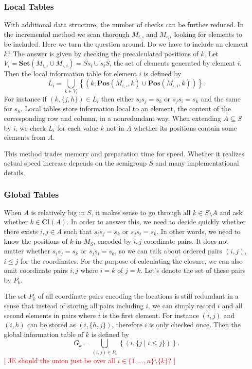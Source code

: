 \documentclass{amsart}
\newcommand{\Set}{\mathbf{Set}}
\newcommand{\Closure}{\mathbf{Cl}}
\newcommand{\Pos}{\mathbf{Pos}}
\newcommand{\todo}[1]{\textcolor{red}{ \small \textsf{[ #1 ]} \normalsize}}
\theoremstyle{plain}
\theoremstyle{definition}
\begin{document}
\subsubsection{Local Tables}
With additional data structure, the number of checks can be further reduced. 
In the incremental method we scan thorough $M_{i,\square}$ and $M_{\square,i}$ looking for elements to be included.
Here we turn the question around.
Do we have to include an element $k$?
The answer is given by checking the precalculated positions of $k$. 
Let $V_i=\Set(M_{i,\square}\cup M_{\square,i})=Ss_i\cup s_iS$, the set of elements generated by element $i$.
Then the  local information table for element $i$ is defined by
$$L_i=\bigcup_{k\in V_i}\left\{(k,\Pos(M_{i,\square},k)\cup\Pos(M_{\square,i},k))\right\}.$$
For instance if $(k,\{j,h\})\in L_i$ then either $s_is_j=s_k$ or $s_js_i=s_k$ and the same for $s_h$.
Local tables store information local to an element, the content of the corresponding row and column, in a nonredundant way.
When  extending $A\subseteq S$ by $i$, we check $L_i$ for each value $k$ not in $A$ whether its positions contain some elements from $A$. 

This method trades memory and preparation time for speed. Whether it realizes actual speed increase depends on the semigroup $S$ and many implementational details.

\subsubsection{Global Tables}
When $A$ is relatively big in $S$, it makes sense to go through all $k\in S\setminus A$ and ask whether $k\in\Closure(A)$. 
In order to answer this, we need to decide quickly whether there exists $i,j\in A$ such that $s_is_j=s_k$ or $s_js_i=s_k$.
In other words, we need to know the positions of $k$ in $M_S$, encoded by $i,j$ coordinate pairs.
It does not matter whether $s_is_j=s_k$ or $s_js_i=s_k$, so we can talk about ordered pairs $(i,j)$, $i\leq j$ for the coordinates. 
For the purpose of calculating the closure, we can also omit coordinate pairs $i,j$ where $i=k$ of $j=k$. 
Let's denote the set of these pairs by $P_k$.

The set $P_k$ of all coordinate pairs encoding the locations is still redundant in a sense that instead of storing all pairs including $i$, we can simply record $i$ and all second  elements in  pairs where $i$ is the first element.
For instance $(i,j)$ and $(i,h)$ can be stored as $(i,\{h,j\})$, therefore $i$ is only checked once.
Then the  global information table of $k$ is defined by
$$G_k=\bigcup_{(i,j)\in P_k} \left\{ (i,\{j\mid i\leq j\})\right\}.$$
\todo{JE should the union just be over all $i\in\{1,\ldots,n\}\setminus\{k\}$?}
\end{document}
